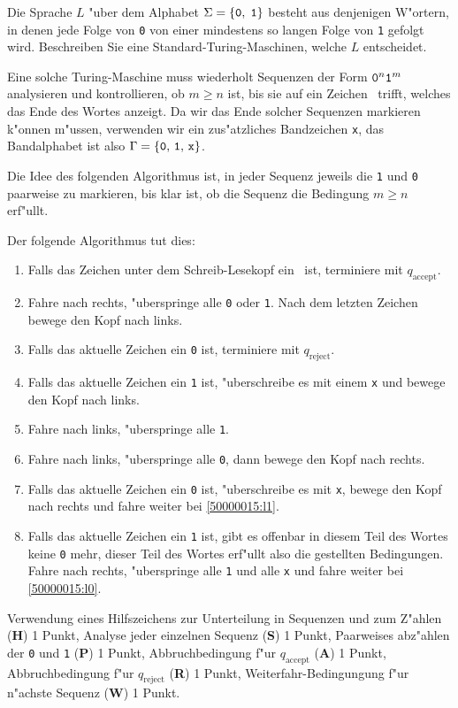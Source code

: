 Die Sprache $L$ "uber dem Alphabet $\Sigma = \{{\tt 0},\;{\tt 1}\}$
besteht aus denjenigen W"ortern, in denen jede Folge von {\tt 0}
von einer mindestens so langen Folge von {\tt 1} gefolgt wird.
Beschreiben Sie eine Standard-Turing-Maschinen, welche $L$
entscheidet.

\begin{loesung}
Eine solche Turing-Maschine muss wiederholt Sequenzen der
Form ${\tt 0}^n{\tt 1}^m$ analysieren und kontrollieren, ob $m \ge n$ ist,
bis sie auf ein Zeichen \blank\ trifft, welches das Ende des
Wortes anzeigt. Da wir das Ende solcher Sequenzen markieren 
k"onnen m"ussen, verwenden wir ein zus"atzliches Bandzeichen
{\tt x}, das Bandalphabet ist also $\Gamma
=\{{\tt 0},\,{\tt 1},\,{\tt x}\}$.

Die Idee des folgenden Algorithmus ist, in jeder Sequenz jeweils
die {\tt 1} und {\tt 0} paarweise zu markieren, bis klar ist,
ob die Sequenz die Bedingung $m\ge n$ erf"ullt.

Der folgende Algorithmus tut dies:
\begin{enumerate}
\item
\label{50000015:l0}
Falls das Zeichen unter dem Schreib-Lesekopf ein \blank\ ist,
terminiere mit $q_{\text{accept}}$.
\item
\label{50000015:l1}
Fahre nach rechts, "uberspringe alle {\tt 0} oder {\tt 1}.
Nach dem letzten Zeichen bewege den Kopf nach links.
\item Falls das aktuelle Zeichen ein {\tt 0} ist, terminiere mit
$q_{\text{reject}}$.
\item Falls das aktuelle Zeichen ein {\tt 1} ist, "uberschreibe es
mit einem {\tt x} und bewege den Kopf nach links.
\item Fahre nach links, "uberspringe alle {\tt 1}.
\item Fahre nach links, "uberspringe alle {\tt 0},
dann bewege den Kopf nach rechts.
\item Falls das aktuelle Zeichen ein {\tt 0} ist, "uberschreibe es mit
{\tt x}, bewege den Kopf nach rechts und fahre weiter bei \ref{50000015:l1}.
\item Falls das aktuelle Zeichen ein {\tt 1} ist, gibt es offenbar in
diesem Teil des Wortes keine {\tt 0} mehr, dieser Teil des Wortes
erf"ullt also die gestellten Bedingungen. Fahre nach rechts, "uberspringe
alle {\tt 1} und alle {\tt x} und fahre weiter bei \ref{50000015:l0}.
\end{enumerate}
\end{loesung}

\begin{bewertung}
Verwendung eines Hilfszeichens zur Unterteilung in Sequenzen
und zum Z"ahlen ({\bf H}) 1 Punkt,
Analyse jeder einzelnen Sequenz ({\bf S}) 1 Punkt,
Paarweises abz"ahlen der {\tt 0} und {\tt 1} ({\bf P}) 1 Punkt,
Abbruchbedingung f"ur $q_{\text{accept}}$ ({\bf A}) 1 Punkt,
Abbruchbedingung f"ur $q_{\text{reject}}$ ({\bf R}) 1 Punkt,
Weiterfahr-Bedingungung f"ur n"achste Sequenz ({\bf W}) 1 Punkt.
\end{bewertung}


